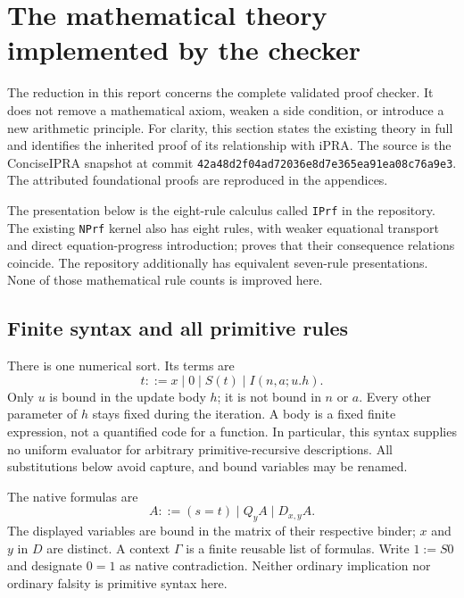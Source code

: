 \section{The mathematical theory implemented by the checker}
\label{sec:unchanged-native-theory}

The reduction in this report concerns the complete validated proof checker.
It does not remove a mathematical axiom, weaken a side condition, or introduce
a new arithmetic principle. For clarity, this section states the existing
theory in full and identifies the inherited proof of its relationship with
iPRA. The source is the ConciseIPRA snapshot at commit
\texttt{42a48d2f04ad72036e8d7e365ea91ea08c76a9e3}.
The attributed foundational proofs are reproduced in the appendices.

The presentation below is the eight-rule calculus called \texttt{IPrf} in
the repository. The existing \texttt{NPrf} kernel also has eight rules, with
weaker equational transport and direct equation-progress introduction;
 proves that their consequence relations coincide.
The repository additionally has equivalent seven-rule presentations.
None of those mathematical rule counts is improved here.

\subsection{Finite syntax and all primitive rules}

There is one numerical sort. Its terms are
\[
 t ::= x\mid 0\mid S(t)\mid I(n,a;u.h).
\]
Only $u$ is bound in the update body $h$; it is not bound in $n$ or $a$.
Every other parameter of $h$ stays fixed during the iteration. A body is a
fixed finite expression, not a quantified code for a function. In particular,
this syntax supplies no uniform evaluator for arbitrary primitive-recursive
descriptions. All substitutions below avoid capture, and bound variables may
be renamed.

The native formulas are
\[
 A ::= (s=t)\mid Q_yA\mid D_{x,y}A.
\]
The displayed variables are bound in the matrix of their respective binder;
$x$ and $y$ in $D$ are distinct. A context $\Gamma$ is a finite reusable list
of formulas. Write $1:=S0$ and designate $0=1$ as native contradiction.
Neither ordinary implication nor ordinary falsity is primitive syntax here.


